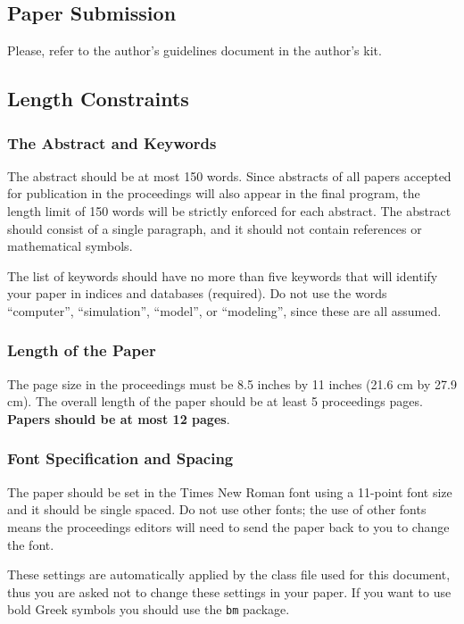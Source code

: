 \documentclass{scspaperproc}
\theoremstyle{scsthe}
\begin{document}
\subsection{Paper Submission}

Please, refer to the author's guidelines document in the author's kit.

\subsection{Length Constraints}

\subsubsection{The Abstract and Keywords}
The abstract should be at most 150 words. Since abstracts of all papers accepted for publication in the proceedings will also appear in the final program, the length limit of 150 words will be strictly enforced for each abstract. The abstract should consist of a single paragraph, and it should not contain references or mathematical symbols. 

The list of keywords should have no more than five keywords that will identify your paper in indices and databases (required). Do not use the words “computer”, “simulation”, “model”, or “modeling”, since these are all assumed.

\subsubsection{Length of the Paper}
The page size in the proceedings must be 8.5 inches by 11 inches (21.6 cm by 27.9 cm). The overall length of the paper should be at least 5 proceedings pages. \textbf{Papers should be at most 12 pages}.

\subsubsection{Font Specification and Spacing}
The paper should be set in the Times New Roman font using a 11-point font size and it should be single spaced. Do not use other fonts; the use of other fonts means the proceedings editors will need to send the paper back to you to change the font.

These settings are automatically applied by the class file used for this document, thus you are asked not to change these settings in your paper. If you want to use bold Greek symbols you should use the \texttt{bm} package.
\end{document}
